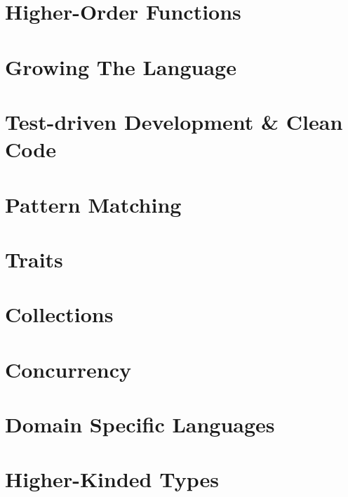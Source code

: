 \part[Higher-Order Functions]{Higher-Order Functions}
\part[Growing The Language]{Growing The Language}
\part[TDD \& Clean Code]{Test-driven Development \& Clean Code}
\part[Pattern Matching]{Pattern Matching}
\part[Traits]{Traits}
\part[Collections]{Collections}
\part[Concurrency]{Concurrency}
\part[DSLs]{Domain Specific Languages}
\part[Higher-Kinded Types]{Higher-Kinded Types}